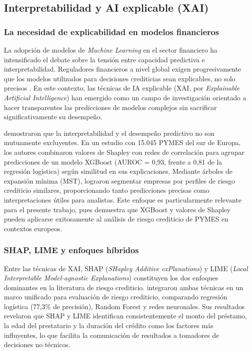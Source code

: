 \documentclass[12pt, letterpaper]{article}
\begin{document}
\subsection{Interpretabilidad y AI explicable (XAI)}
\label{sec:xai}

\subsubsection{La necesidad de explicabilidad en modelos financieros}

La adopci\'on de modelos de \textit{Machine Learning} en el sector financiero ha intensificado el debate sobre la tensi\'on entre capacidad predictiva e interpretabilidad. Reguladores financieros a nivel global exigen progresivamente que los modelos utilizados para decisiones crediticias sean explicables, no solo precisos \citep{Bazarbash2019}. En este contexto, las t\'ecnicas de IA explicable (XAI, por \textit{Explainable Artificial Intelligence}) han emergido como un campo de investigaci\'on orientado a hacer transparentes las predicciones de modelos complejos sin sacrificar significativamente su desempe\~no.

\citet{Bussmann2020} demostraron que la interpretabilidad y el desempe\~no predictivo no son mutuamente excluyentes. En un estudio con 15.045 PYMES del sur de Europa, los autores combinaron valores de Shapley con redes de correlaci\'on para agrupar predicciones de un modelo XGBoost (AUROC = 0,93, frente a 0,81 de la regresi\'on log\'istica) seg\'un similitud en sus explicaciones. Mediante \'arboles de expansi\'on m\'inima (MST), lograron segmentar empresas por perfiles de riesgo crediticio similares, proporcionando tanto predicciones precisas como interpretaciones \'utiles para analistas. Este enfoque es particularmente relevante para el presente trabajo, pues demuestra que XGBoost y valores de Shapley pueden aplicarse exitosamente al an\'alisis de riesgo crediticio de PYMES en contextos europeos.

\subsubsection{SHAP, LIME y enfoques h\'ibridos}

Entre las t\'ecnicas de XAI, SHAP (\textit{SHapley Additive exPlanations}) y LIME (\textit{Local Interpretable Model-agnostic Explanations}) constituyen los dos enfoques dominantes en la literatura de riesgo crediticio. \citet{Oyeyemi2025} integraron ambas t\'ecnicas en un marco unificado para evaluaci\'on de riesgo crediticio, comparando regresi\'on log\'istica (77,3\% de precisi\'on), Random Forest y redes neuronales. Sus resultados revelaron que SHAP y LIME identifican consistentemente el monto del pr\'estamo, la edad del prestatario y la duraci\'on del cr\'edito como los factores m\'as influyentes, lo que facilita la comunicaci\'on de resultados a tomadores de decisiones no t\'ecnicos.
\end{document}
